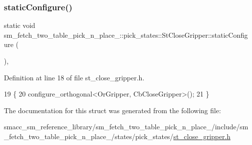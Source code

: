 \subsubsection{\texorpdfstring{static\+Configure()}{staticConfigure()}}
{\footnotesize\ttfamily static void sm\+\_\+fetch\+\_\+two\+\_\+table\+\_\+pick\+\_\+n\+\_\+place\+\_\+::pick\+\_\+states\+::\+St\+Close\+Gripper\+::static\+Configure (\begin{DoxyParamCaption}{ }\end{DoxyParamCaption})\hspace{0.3cm}{\ttfamily [inline]}, {\ttfamily [static]}}



Definition at line 18 of file st\+\_\+close\+\_\+gripper.\+h.


\begin{DoxyCode}
19    \{
20       configure\_orthogonal<OrGripper, CbCloseGripper>();
21    \}
\end{DoxyCode}


The documentation for this struct was generated from the following file\+:\begin{DoxyCompactItemize}
\item 
smacc\+\_\+sm\+\_\+reference\+\_\+library/sm\+\_\+fetch\+\_\+two\+\_\+table\+\_\+pick\+\_\+n\+\_\+place\+\_/include/sm\+\_\+fetch\+\_\+two\+\_\+table\+\_\+pick\+\_\+n\+\_\+place\+\_/states/pick\+\_\+states/\hyperlink{sm__fetch__two__table__pick__n__place__1_2include_2sm__fetch__two__table__pick__n__place__1_2stab6c740b6a4921b74c47f90995fb96426}{st\+\_\+close\+\_\+gripper.\+h}\end{DoxyCompactItemize}
